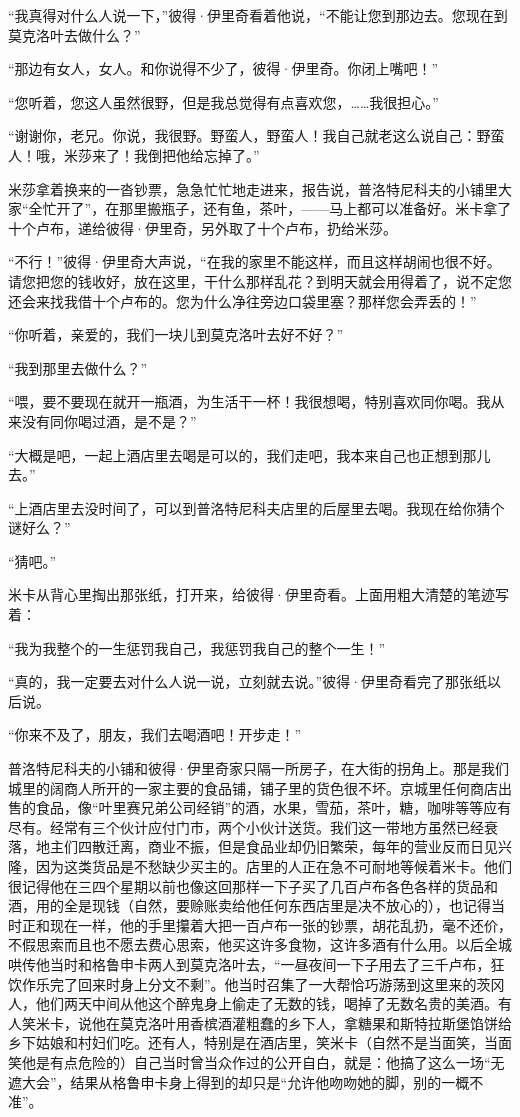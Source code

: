 \par “我真得对什么人说一下，”彼得·伊里奇看着他说，“不能让您到那边去。您现在到莫克洛叶去做什么？”
\par “那边有女人，女人。和你说得不少了，彼得·伊里奇。你闭上嘴吧！”
\par “您听着，您这人虽然很野，但是我总觉得有点喜欢您，……我很担心。”
\par “谢谢你，老兄。你说，我很野。野蛮人，野蛮人！我自己就老这么说自己：野蛮人！哦，米莎来了！我倒把他给忘掉了。”
\par 米莎拿着换来的一沓钞票，急急忙忙地走进来，报告说，普洛特尼科夫的小铺里大家“全忙开了”，在那里搬瓶子，还有鱼，茶叶，——马上都可以准备好。米卡拿了十个卢布，递给彼得·伊里奇，另外取了十个卢布，扔给米莎。
\par “不行！”彼得·伊里奇大声说，“在我的家里不能这样，而且这样胡闹也很不好。请您把您的钱收好，放在这里，干什么那样乱花？到明天就会用得着了，说不定您还会来找我借十个卢布的。您为什么净往旁边口袋里塞？那样您会弄丢的！”
\par “你听着，亲爱的，我们一块儿到莫克洛叶去好不好？”
\par “我到那里去做什么？”
\par “喂，要不要现在就开一瓶酒，为生活干一杯！我很想喝，特别喜欢同你喝。我从来没有同你喝过酒，是不是？”
\par “大概是吧，一起上酒店里去喝是可以的，我们走吧，我本来自己也正想到那儿去。”
\par “上酒店里去没时间了，可以到普洛特尼科夫店里的后屋里去喝。我现在给你猜个谜好么？”
\par “猜吧。”
\par 米卡从背心里掏出那张纸，打开来，给彼得·伊里奇看。上面用粗大清楚的笔迹写着：
\par “我为我整个的一生惩罚我自己，我惩罚我自己的整个一生！”
\par “真的，我一定要去对什么人说一说，立刻就去说。”彼得·伊里奇看完了那张纸以后说。
\par “你来不及了，朋友，我们去喝酒吧！开步走！”
\par 普洛特尼科夫的小铺和彼得·伊里奇家只隔一所房子，在大街的拐角上。那是我们城里的阔商人所开的一家主要的食品铺，铺子里的货色很不坏。京城里任何商店出售的食品，像“叶里赛兄弟公司经销”的酒，水果，雪茄，茶叶，糖，咖啡等等应有尽有。经常有三个伙计应付门市，两个小伙计送货。我们这一带地方虽然已经衰落，地主们四散迁离，商业不振，但是食品业却仍旧繁荣，每年的营业反而日见兴隆，因为这类货品是不愁缺少买主的。店里的人正在急不可耐地等候着米卡。他们很记得他在三四个星期以前也像这回那样一下子买了几百卢布各色各样的货品和酒，用的全是现钱（自然，要赊账卖给他任何东西店里是决不放心的），也记得当时正和现在一样，他的手里攥着大把一百卢布一张的钞票，胡花乱扔，毫不还价，不假思索而且也不愿去费心思索，他买这许多食物，这许多酒有什么用。以后全城哄传他当时和格鲁申卡两人到莫克洛叶去，“一昼夜间一下子用去了三千卢布，狂饮作乐完了回来时身上分文不剩”。他当时召集了一大帮恰巧游荡到这里来的茨冈人，他们两天中间从他这个醉鬼身上偷走了无数的钱，喝掉了无数名贵的美酒。有人笑米卡，说他在莫克洛叶用香槟酒灌粗蠢的乡下人，拿糖果和斯特拉斯堡馅饼给乡下姑娘和村妇们吃。还有人，特别是在酒店里，笑米卡（自然不是当面笑，当面笑他是有点危险的）自己当时曾当众作过的公开自白，就是：他搞了这么一场“无遮大会”，结果从格鲁申卡身上得到的却只是“允许他吻吻她的脚，别的一概不准”。
